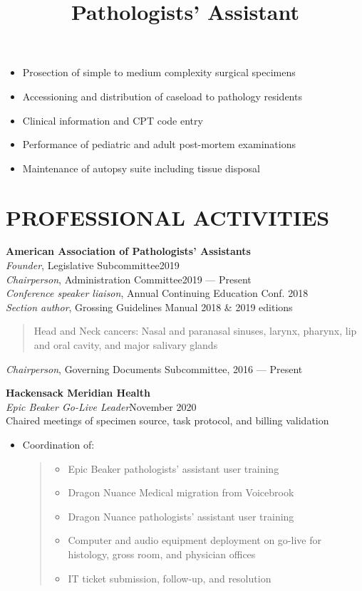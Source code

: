 \documentclass[margin]{res}
\begin{document}
\begin{resume}
\title{\textbf{Pathologists’ Assistant}}
\begin{position}
\begin{itemize}
\item Prosection of simple to medium complexity surgical specimens
\item Accessioning and distribution of caseload to pathology residents
\item Clinical information and CPT code entry
\item Performance of pediatric and adult post-mortem examinations
\item Maintenance of autopsy suite including tissue disposal
\end{itemize}
\end{position}

\section{PROFESSIONAL ACTIVITIES}
\par
\textbf{American Association of Pathologists’ Assistants} \\
\emph{Founder}, Legislative Subcommittee\hfill 2019\\
\emph{Chairperson}, Administration Committee\hfill2019 --- Present\\
\emph{Conference speaker liaison}, Annual Continuing Education Conf. \hfill 2018\\
\emph{Section author}, Grossing Guidelines Manual \hfill 2018 \& 2019 editions
\begin{quote}
Head and Neck cancers: Nasal and paranasal sinuses, larynx, pharynx, lip and oral cavity, and major salivary glands
\end{quote}
\emph{Chairperson}, Governing Documents Subcommittee, 2016 --- Present


\par
\textbf{Hackensack Meridian Health}\\
\emph{Epic Beaker Go-Live Leader}\hfill November 2020
\\
Chaired meetings of specimen source, task protocol, and billing validation
\begin{itemize}
\item Coordination of:

\begin{quote}
\begin{itemize}
\item Epic Beaker pathologists’ assistant user training
\item Dragon Nuance Medical migration from Voicebrook
\item Dragon Nuance pathologists’ assistant user training
\item Computer and audio equipment deployment on go-live for histology, gross room, and physician offices
\item IT ticket submission, follow-up, and resolution


\end{itemize}
\end{quote}
\end{itemize}
\end{resume}
\end{document}
